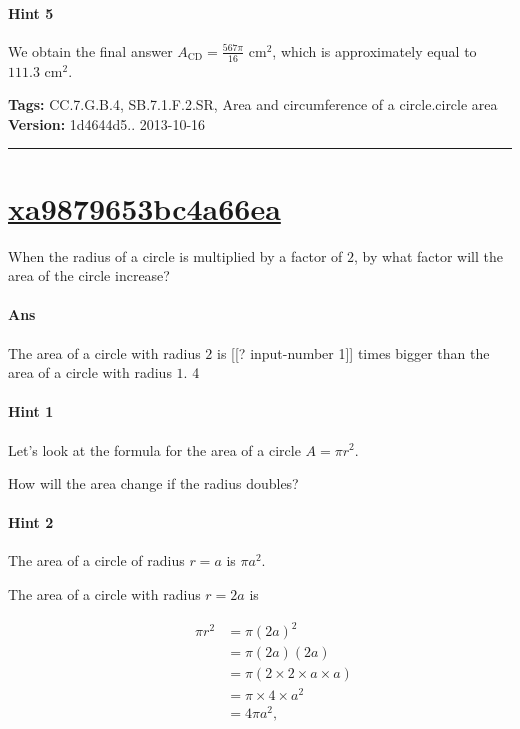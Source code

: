 \documentclass[twocolumn,10pt]{article}
\begin{document}
\paragraph{Hint 5}We obtain the final answer $A_{\text{CD}}=\frac{567\pi}{16}\text{ cm}^2$, which is approximately equal to $111.3\text{ cm}^2$.



\medskip
\noindent
\textbf{Tags:} {\footnotesize CC.7.G.B.4, SB.7.1.F.2.SR, Area and circumference of a circle.circle area}\\
\textbf{Version:} 1d4644d5.. 2013-10-16
\smallskip\hrule





\section{\href{https://www.khanacademy.org/devadmin/content/items/xa9879653bc4a66ea}{xa9879653bc4a66ea}}

\noindent
When the radius of a circle is multiplied by a factor of $2$, by what factor will the area of the circle increase?

\paragraph{Ans} \DIFaddbegin {}

\DIFaddend The area of a circle with radius $2$ is [[? input-number 1]] times bigger than the area of a circle with radius $1$.
  4

\paragraph{Hint 1}Let's look at the formula for the area of a circle $A=\pi r^2$. 

How will the area change if the radius doubles?

\paragraph{Hint 2}The area of a circle of radius $r=a$ is $\pi a^2$.

The area of a circle with radius $r=2a$ is 

\begin{align*}
\qquad  \pi r^2 & =\pi (2a)^2  \\
  & =\pi(2a)(2a) \\
  &=\pi(2 \times 2 \times a \times a)  \\
   &= \pi \times 4 \times a^2 \\
   &= 4\pi a^2,
\end{align*} 
\end{document}
